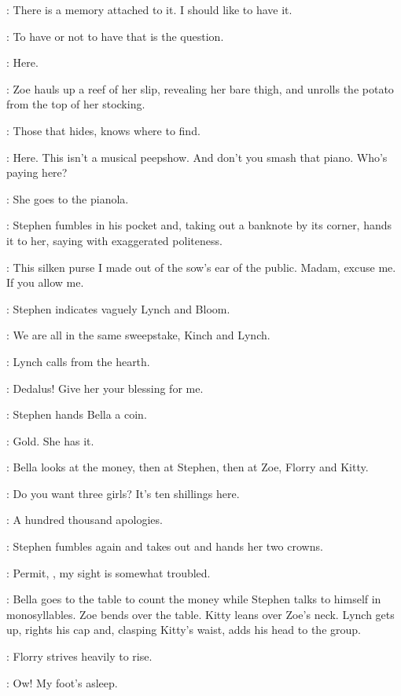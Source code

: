 \Bloom:
There is a memory attached to it.
I should like to have it.

\Stephen[1]:
To have or not to have that is the question.

\Zoe:
Here.

:
Zoe hauls up a reef of her slip, revealing her bare thigh,
and unrolls the potato from the top of her stocking.

\Zoe:
Those that hides, knows where to find.

\Bella:
Here.
This isn't a musical peepshow.
And don't you smash that piano.
Who's paying here?

:
She goes to the pianola.

:
Stephen fumbles in his pocket and,
taking out a banknote by its corner, hands it to her,
saying with exaggerated politeness.

\Stephen:
This silken purse I made out of the sow's ear of the public.
Madam, excuse me.
If you allow me.

:
Stephen indicates vaguely Lynch and Bloom.

\Stephen:
We are all in the same sweepstake, Kinch and Lynch.

:
Lynch calls from the hearth.

\Lynch:
Dedalus!
Give her your blessing for me.

:
Stephen hands Bella a coin.

\Stephen:
Gold.
She has it.

:
Bella looks at the money, then at Stephen, then at Zoe, Florry and Kitty.

\Bella:
Do you want three girls?
It's ten shillings here.

\Stephen:
A hundred thousand apologies.

:
Stephen fumbles again and takes out and hands her two crowns.

\Stephen:
Permit, , my sight is somewhat troubled.

:
Bella goes to the table to count the money
while Stephen talks to himself in monosyllables.
Zoe bends over the table.
Kitty leans over Zoe's neck.
Lynch gets up, rights his cap and, clasping Kitty's waist,
adds his head to the group.

:
Florry strives heavily to rise.

\Florry:
Ow!
My foot's asleep.

